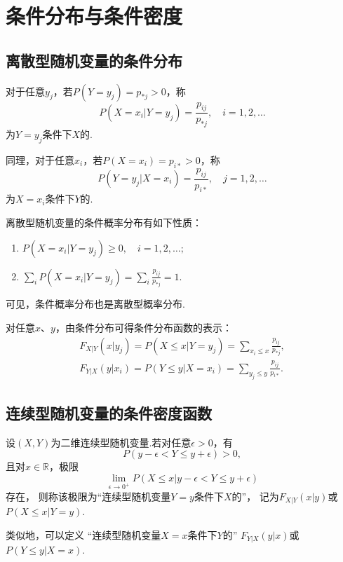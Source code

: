 \section{条件分布与条件密度}
\subsection{离散型随机变量的条件分布}
\begin{definition}
对于任意\(y_j\)，若\(P(Y=y_j) = p_{*j} > 0\)，称\[
P(X=x_i \vert Y=y_j) = \frac{p_{ij}}{p_{*j}}, \quad i=1,2,\dotsc
\]为\(Y=y_j\)条件下\(X\)的.

同理，对于任意\(x_i\)，若\(P(X=x_i) = p_{i*} > 0\)，称\[
P(Y=y_j \vert X=x_i) = \frac{p_{ij}}{p_{i*}}, \quad j=1,2,\dotsc
\]为\(X=x_i\)条件下\(Y\)的.
\end{definition}

\begin{property}
离散型随机变量的条件概率分布有如下性质：
\begin{enumerate}
\item \(P(X=x_i \vert Y=y_j) \geq 0, \quad i=1,2,\dotsc;\)
\item \(\sum_{i}{P(X=x_i \vert Y=y_j)} = \sum_{i}{\frac{p_{ij}}{p_{*j}}} = 1.\)
\end{enumerate}
可见，条件概率分布也是离散型概率分布.
\end{property}

\begin{theorem}
对任意\(x\)、\(y\)，由条件分布可得条件分布函数的表示：
\begin{align*}
F_{X \vert Y}(x \vert y_j) = P(X \leq x \vert Y=y_j) = \sum_{x_i \leq x}{\frac{p_{ij}}{p_{*j}}}, \\
F_{Y \vert X}(y \vert x_i) = P(Y \leq y \vert X=x_i) = \sum_{y_j \leq y}{\frac{p_{ij}}{p_{i*}}}.
\end{align*}
\end{theorem}

\subsection{连续型随机变量的条件密度函数}
\begin{definition}
设\((X,Y)\)为二维连续型随机变量.若对任意\(\epsilon > 0\)，有\[
P(y - \epsilon < Y \leq y + \epsilon) > 0,
\]且对\(x\in\mathbb{R}\)，极限\[
\lim_{\epsilon\to0^+} P(X \leq x \vert y - \epsilon < Y \leq y + \epsilon)
\]存在，
则称该极限为“连续型随机变量\(Y=y\)条件下\(X\)的”，
记为\(F_{X \vert Y}(x \vert y)\)或\(P(X \leq x \vert Y = y)\).

类似地，可以定义%
“连续型随机变量\(X=x\)条件下\(Y\)的”%
\(F_{Y \vert X}(y \vert x)\)或\(P(Y \leq y \vert X = x)\).
\end{definition}

